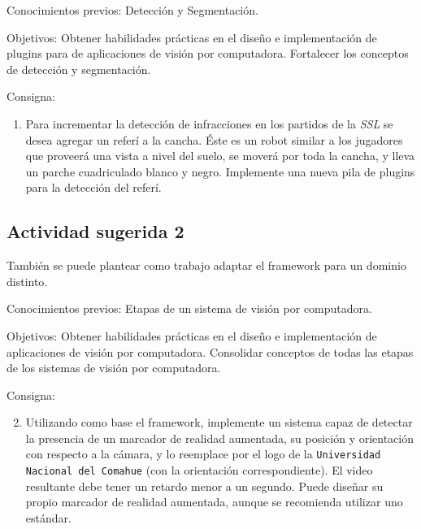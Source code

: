 \begin{description}

	\item{Conocimientos previos}: Detección y Segmentación.

	\item{Objetivos}: Obtener habilidades prácticas en el diseño e
		implementación de plugins para de aplicaciones de visión por
		computadora. Fortalecer los conceptos de detección y
		segmentación.

	\item{Consigna}: \begin{enumerate}

	\item{Para incrementar la detección de infracciones en los partidos de
		la \emph{SSL} se desea agregar un referí a la cancha. Éste es un
		robot similar a los jugadores que proveerá una vista a nivel del
		suelo, se moverá por toda la cancha, y lleva un parche
		cuadriculado blanco y negro. Implemente una nueva pila de
		plugins para la detección del referí.}

\end{enumerate}

\end{description}

\subsection{Actividad sugerida 2}

También se puede plantear como trabajo adaptar el framework para un dominio
distinto.

\begin{description}

	\item{Conocimientos previos}: Etapas de un sistema de visión por
		computadora.

	\item{Objetivos}: Obtener habilidades prácticas en el diseño e
		implementación de aplicaciones de visión por computadora.
		Consolidar conceptos de todas las etapas de los sistemas de
		visión por computadora.

	\item{Consigna}: \begin{enumerate}

	\setcounter{enumi}{1}

	\item{Utilizando como base el framework, implemente un sistema capaz de
		detectar la presencia de un marcador de realidad aumentada, su
		posición y orientación con respecto a la cámara, y lo reemplace
		por el logo de la \texttt{Universidad Nacional del Comahue} (con
		la orientación correspondiente). El video resultante debe tener
		un retardo menor a un segundo. Puede diseñar su propio marcador
		de realidad aumentada, aunque se recomienda utilizar uno
		estándar.}

\end{enumerate}

\end{description}
